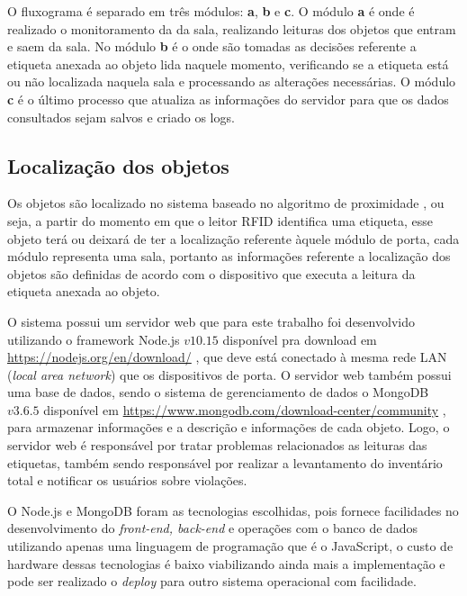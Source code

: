 \par
O fluxograma é separado em três módulos: \textbf{a}, \textbf{b} e \textbf{c}. O módulo \textbf{a} é onde é realizado o
monitoramento da da sala, realizando leituras dos objetos que entram e saem da sala. No módulo \textbf{b} é o onde são
tomadas as decisões referente a etiqueta anexada ao objeto lida naquele momento, verificando se a etiqueta está ou não
localizada naquela sala e processando as alterações necessárias. O módulo \textbf{c} é o último processo que atualiza as
informações do servidor para que os dados consultados sejam salvos e criado os logs.


\subsection{Localização dos objetos}

Os objetos são localizado no sistema baseado no algoritmo de proximidade \cite{rfid2009review} %
, ou seja, a partir do momento em que o leitor
RFID identifica uma etiqueta, esse objeto terá ou deixará de ter a localização referente àquele módulo de porta, cada módulo representa uma sala, portanto as informações referente a localização dos objetos são definidas de acordo com o dispositivo que executa a leitura da etiqueta anexada ao objeto.

\par
O sistema possui um servidor web que para este trabalho foi desenvolvido utilizando o framework Node.js $v10.15$ disponível pra download em \url{https://nodejs.org/en/download/}%
, que deve está conectado à mesma rede LAN (\textit{local area network}) que os dispositivos de porta. O servidor web também possui uma base de dados, sendo o sistema de gerenciamento de dados o MongoDB $v3.6.5$ disponível em \url{https://www.mongodb.com/download-center/community}%
, para armazenar informações e a descrição e informações de cada objeto. Logo, o servidor web é responsável por tratar problemas relacionados as leituras das  etiquetas, também sendo responsável por realizar a levantamento do inventário total e notificar os usuários sobre violações.

\par
O Node.js e MongoDB foram as tecnologias escolhidas, pois fornece facilidades no desenvolvimento do \textit{front-end, back-end} e operações com o banco de dados utilizando apenas uma linguagem de programação que é o JavaScript, o custo de hardware dessas tecnologias é baixo viabilizando ainda mais a implementação e pode ser realizado o \textit{deploy} para outro sistema operacional com facilidade.

